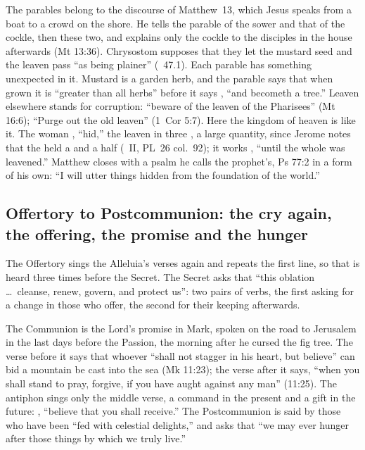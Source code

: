 The parables belong to the discourse of Matthew~13, which Jesus speaks from a
boat to a crowd on the shore. He tells the parable of the sower and that of
the cockle, then these two, and explains only the cockle to the disciples in
the house afterwards (Mt 13:36). Chrysostom supposes that they let the mustard
seed and the leaven pass ``as being plainer'' (~47.1). Each
parable has something unexpected in it. Mustard is a garden herb, and the
parable says that when grown it is ``greater than all herbs'' before it says
, ``and becometh a tree.'' Leaven elsewhere stands for
corruption: ``beware of the leaven of the Pharisees'' (Mt 16:6); ``Purge out
the old leaven'' (1~Cor 5:7). Here the kingdom of heaven is like it. The woman
, ``hid,'' the leaven in three , a large
quantity, since Jerome notes that the  held a  and a
half (~II, PL~26 col.~92); it works , ``until the whole was leavened.'' Matthew closes with a
psalm he calls the prophet's, Ps 77:2 in a form of his own: ``I will utter
things hidden from the foundation of the world.''

\subsection{Offertory to Postcommunion: the cry again, the offering, the promise and the hunger}

The Offertory sings the Alleluia's verses again and repeats the first line, so that  is
heard three times before the Secret. The Secret asks that ``this oblation
\dots\ cleanse, renew, govern, and protect us'': two pairs of verbs, the first
asking for a change in those who offer, the second for their keeping
afterwards.

The Communion is the Lord's promise in Mark, spoken on the road to Jerusalem
in the last days before the Passion, the morning after he cursed the fig tree.
The verse before it says that whoever ``shall not stagger in his heart, but
believe'' can bid a mountain be cast into the sea (Mk 11:23); the verse after
it says, ``when you shall stand to pray, forgive, if you have aught against
any man'' (11:25). The antiphon sings only the middle verse, a command in the
present and a gift in the future: , ``believe
that you shall receive.'' The Postcommunion is said by those who have been
``fed with celestial delights,'' and asks that ``we may ever hunger after those
things by which we truly live.''
